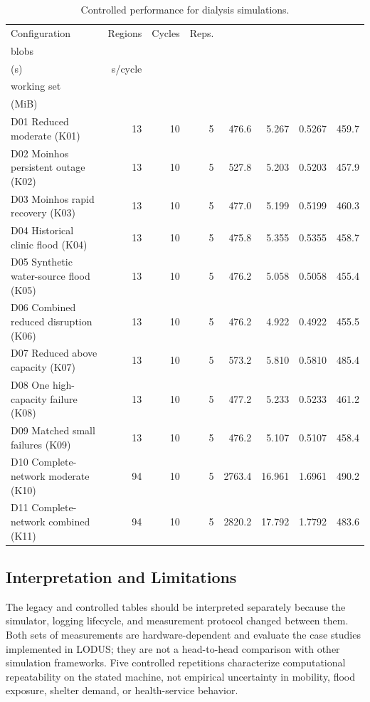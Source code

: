 \begin{table}[htbp]
\centering
\caption{Controlled performance for dialysis simulations.}
\label{tab:quantitative-performance-dialysis}
\begin{tabularx}{\textwidth}{@{}>{\raggedright\arraybackslash}Xrrrrrrr@{}}
\toprule
Configuration & Regions & Cycles & Reps. & \begin{tabular}[c]{@{}c@{}}Mean max.\\blobs\end{tabular} & \begin{tabular}[c]{@{}c@{}}Mean runtime\\(s)\end{tabular} & s/cycle & \begin{tabular}[c]{@{}c@{}}Mean peak\\working set\\(MiB)\end{tabular} \\
\midrule
D01 Reduced moderate (K01) & 13 & 10 & 5 & 476.6 & 5.267 & 0.5267 & 459.7 \\
D02 Moinhos persistent outage (K02) & 13 & 10 & 5 & 527.8 & 5.203 & 0.5203 & 457.9 \\
D03 Moinhos rapid recovery (K03) & 13 & 10 & 5 & 477.0 & 5.199 & 0.5199 & 460.3 \\
D04 Historical clinic flood (K04) & 13 & 10 & 5 & 475.8 & 5.355 & 0.5355 & 458.7 \\
D05 Synthetic water-source flood (K05) & 13 & 10 & 5 & 476.2 & 5.058 & 0.5058 & 455.4 \\
D06 Combined reduced disruption (K06) & 13 & 10 & 5 & 476.2 & 4.922 & 0.4922 & 455.5 \\
D07 Reduced above capacity (K07) & 13 & 10 & 5 & 573.2 & 5.810 & 0.5810 & 485.4 \\
D08 One high-capacity failure (K08) & 13 & 10 & 5 & 477.2 & 5.233 & 0.5233 & 461.2 \\
D09 Matched small failures (K09) & 13 & 10 & 5 & 476.2 & 5.107 & 0.5107 & 458.4 \\
D10 Complete-network moderate (K10) & 94 & 10 & 5 & 2763.4 & 16.961 & 1.6961 & 490.2 \\
D11 Complete-network combined (K11) & 94 & 10 & 5 & 2820.2 & 17.792 & 1.7792 & 483.6 \\
\bottomrule
\end{tabularx}
\end{table}

\endgroup

\subsection{Interpretation and Limitations}

The legacy and controlled tables should be interpreted separately because the
simulator, logging lifecycle, and measurement protocol changed between them.
Both sets of measurements are hardware-dependent and evaluate the case studies
implemented in LODUS; they are not a head-to-head comparison with other
simulation frameworks.  Five controlled repetitions characterize computational
repeatability on the stated machine, not empirical uncertainty in mobility,
flood exposure, shelter demand, or health-service behavior.
